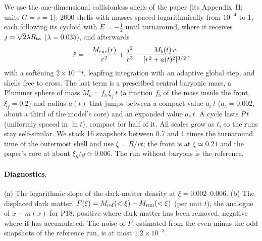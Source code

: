 \documentclass[11pt,a4paper]{article}
\theoremstyle{remark}
\begin{document}
We use the one-dimensional collisionless shells of the paper (its Appendix~H; units
$G=v=1$): 2000 shells with masses spaced logarithmically from $10^{-4}$ to 1, each
following its cycloid with $E=-\tfrac12$ until turnaround, where it receives
$j=\sqrt2\lambda R_{\rm ta}$ ($\lambda=0.035$), and afterwards
\begin{equation}
  \ddot r=-\frac{M_{\rm enc}(r)}{r^2}+\frac{j^2}{r^3}
  -\frac{M_b(t)\,r}{[r^2+a(t)^2]^{3/2}} ,
\end{equation}
with a softening $2\times10^{-4}t$, leapfrog integration with an adaptive global step,
and shells free to cross. The last term is a prescribed central baryonic mass, a
Plummer sphere of mass $M_b=f_b\,\xi_f\,t$ (a fraction $f_b$ of the mass inside the
front, $\xi_f=0.2$) and radius $a(t)$ that jumps between a compact value $a_c\,t$
($a_c=0.002$, about a third of the model's core) and an expanded value $a_e\,t$. A cycle
lasts $P\,t$ (uniformly spaced in $\ln t$), compact for half of it. All scales grow as
$t$, so the runs stay self-similar. We stack 16 snapshots between 0.7 and 1 times the
turnaround time of the outermost shell and use $\xi=R/vt$; the front is at
$\xi\simeq0.21$ and the paper's core at about $\xi_b/y\simeq0.006$. The run without
baryons is the reference.

\paragraph{Diagnostics.} (a) The logarithmic slope of the dark-matter density at
$\xi=0.002$--0.006. (b) The displaced dark matter,
$F(\xi)=M_{\rm ref}(<\xi)-M_{\rm run}(<\xi)$ (per unit $t$), the analogue of
$x-m(x)$ for P18: positive where dark matter has been removed, negative where it has
accumulated. The noise of $F$, estimated from the even minus the odd snapshots of the
reference run, is at most $1.2\times10^{-3}$.
\end{document}
